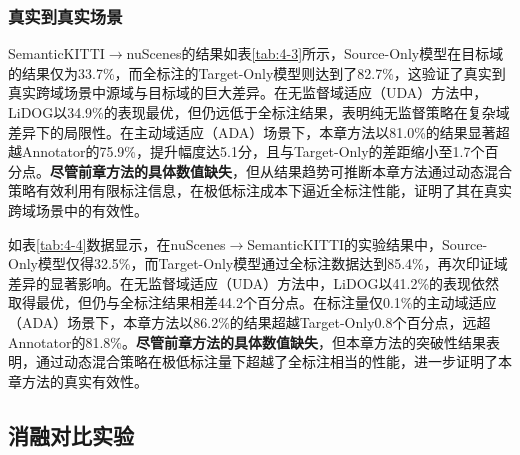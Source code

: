 
    \subsubsection{真实到真实场景}
    SemanticKITTI$\to$nuScenes的结果如表\ref{tab:4-3}所示，Source-Only模型在目标域的结果仅为33.7\%，而全标注的Target-Only模型则达到了82.7\%，这验证了真实到真实跨域场景中源域与目标域的巨大差异。在无监督域适应（UDA）方法中，LiDOG以34.9\%的表现最优，但仍远低于全标注结果，表明纯无监督策略在复杂域差异下的局限性。在主动域适应（ADA）场景下，本章方法以81.0\%的结果显著超越Annotator的75.9\%，提升幅度达5.1分，且与Target-Only的差距缩小至1.7个百分点。\textbf{尽管前章方法的具体数值缺失}，但从结果趋势可推断本章方法通过动态混合策略有效利用有限标注信息，在极低标注成本下逼近全标注性能，证明了其在真实跨域场景中的有效性。
    
    如表\ref{tab:4-4}数据显示，在nuScenes$\to$SemanticKITTI的实验结果中，Source-Only模型仅得32.5\%，而Target-Only模型通过全标注数据达到85.4\%，再次印证域差异的显著影响。在无监督域适应（UDA）方法中，LiDOG以41.2\%的表现依然取得最优，但仍与全标注结果相差44.2个百分点。在标注量仅0.1\%的主动域适应（ADA）场景下，本章方法以86.2\%的结果超越Target-Only0.8个百分点，远超Annotator的81.8\%。\textbf{尽管前章方法的具体数值缺失}，但本章方法的突破性结果表明，通过动态混合策略在极低标注量下超越了全标注相当的性能，进一步证明了本章方法的真实有效性。
    
    
    \subsection{消融对比实验}
